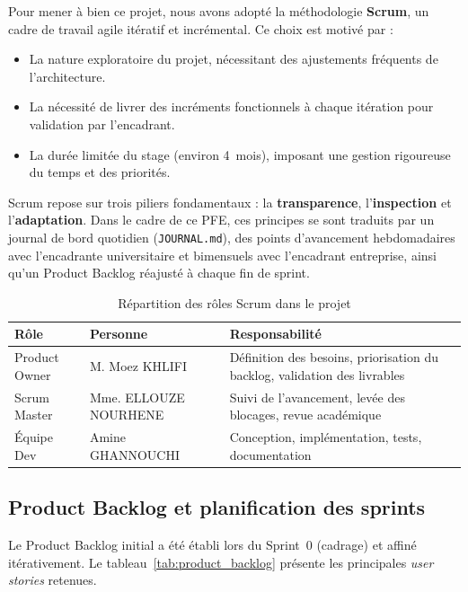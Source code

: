 Pour mener à bien ce projet, nous avons adopté la méthodologie \textbf{Scrum}, un cadre de travail agile itératif et incrémental. Ce choix est motivé par :

\begin{itemize}
  \item La nature exploratoire du projet, nécessitant des ajustements fréquents de l'architecture.
  \item La nécessité de livrer des incréments fonctionnels à chaque itération pour validation par l'encadrant.
  \item La durée limitée du stage (environ 4~mois), imposant une gestion rigoureuse du temps et des priorités.
\end{itemize}

Scrum repose sur trois piliers fondamentaux : la \textbf{transparence}, l'\textbf{inspection} et l'\textbf{adaptation}. Dans le cadre de ce PFE, ces principes se sont traduits par un journal de bord quotidien (\texttt{JOURNAL.md}), des points d'avancement hebdomadaires avec l'encadrante universitaire et bimensuels avec l'encadrant entreprise, ainsi qu'un Product Backlog réajusté à chaque fin de sprint.

\begin{table}[H]
\centering
\caption{Répartition des rôles Scrum dans le projet}
\label{tab:roles_scrum}
\begin{tabular}{llp{6.5cm}}
\toprule
\textbf{Rôle} & \textbf{Personne} & \textbf{Responsabilité} \\
\midrule
Product Owner & M. Moez KHLIFI & Définition des besoins, priorisation du backlog, validation des livrables \\
Scrum Master & Mme. ELLOUZE NOURHENE & Suivi de l'avancement, levée des blocages, revue académique \\
Équipe Dev & Amine GHANNOUCHI & Conception, implémentation, tests, documentation \\
\bottomrule
\end{tabular}
\end{table}

\subsection{Product Backlog et planification des sprints}

Le Product Backlog initial a été établi lors du Sprint~0 (cadrage) et affiné itérativement. Le tableau~\ref{tab:product_backlog} présente les principales \textit{user stories} retenues.

